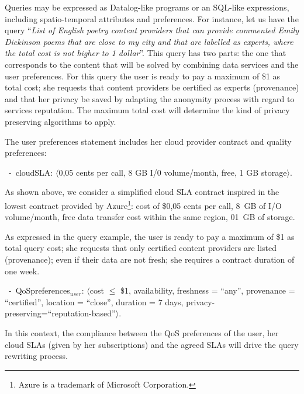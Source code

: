 Queries may be expressed as Datalog-like programs or an SQL-like expressions, including spatio-temporal attributes and preferences.
For instance, let us have the query ``\textit{List of English poetry content providers that can provide commented Emily Dickinson poems that are close to my city and that are labelled as experts, where the total cost is not higher to 1 dollar}''. 
This query has two parts: the one that corresponds to the content that will be solved by combining data services and the user preferences. For this query the user is ready to pay a maximum of \$1 as total cost; she requests that content providers be certified as experts (provenance) and that her privacy be saved by adapting the anonymity process with regard to services reputation. The maximum total cost will determine the kind of privacy preserving algorithms to apply.

The user preferences statement  includes her cloud provider contract and quality preferences:
\begin{trivlist}\sf\footnotesize
\item[~-~cloudSLA:]  $\langle$0,05 cents per call, 8 GB I/0 volume/month, free, 1 GB storage$\rangle$. 
\end{trivlist}

As shown above, we consider a simplified cloud SLA contract inspired in the lowest contract provided by Azure\footnote{Azure is a trademark of Microsoft Corporation.}: {\sf cost of \$0,05 cents per call,  8~GB of I/O volume/month, free data transfer cost within the same region,  01~GB of storage}. 

As expressed in the query example, the user is ready to pay a maximum of {\sf \$1 as total query cost}; she requests that only {\sf certified} content providers are listed (provenance); even if their data are not fresh; she requires a contract duration of one week.

\begin{trivlist}\sf\footnotesize
\item[~-~QoSpreferences$_\mathit{user}$: ] $\langle$cost $\leq$ \$1, availability, freshness = ``any'', provenance = ``certified'', location = ``close'', duration = 7 days, privacy-preserving=``reputation-based''$\rangle$. 
\end{trivlist}

In this context, the compliance between the QoS preferences of the user, her cloud SLAs (given by her subscriptions) and the  agreed SLAs will drive the query rewriting process.

